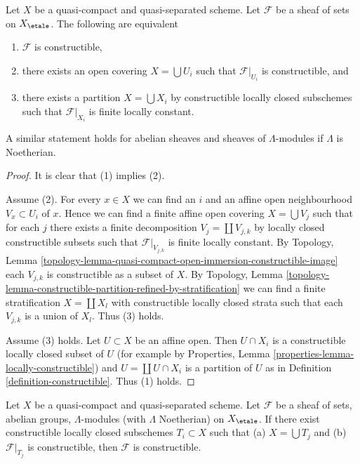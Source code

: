\begin{lemma}
\label{lemma-constructible-quasi-compact-quasi-separated}
Let $X$ be a quasi-compact and quasi-separated scheme. Let $\mathcal{F}$
be a sheaf of sets on $X_\etale$. The following are equivalent
\begin{enumerate}
\item $\mathcal{F}$ is constructible,
\item there exists an open covering $X = \bigcup U_i$ such that
$\mathcal{F}|_{U_i}$ is constructible, and
\item there exists a partition $X = \bigcup X_i$ by constructible
locally closed subschemes such that $\mathcal{F}|_{X_i}$ is finite
locally constant.
\end{enumerate}
A similar statement holds for abelian sheaves and sheaves of
$\Lambda$-modules if $\Lambda$ is Noetherian.
\end{lemma}

\begin{proof}
It is clear that (1) implies (2).

\medskip\noindent
Assume (2). For every $x \in X$ we can find an $i$ and an affine open
neighbourhood $V_x \subset U_i$ of $x$. Hence we can find a finite
affine open covering $X = \bigcup V_j$ such that for each $j$ there
exists a finite decomposition $V_j = \coprod V_{j, k}$ by locally closed
constructible subsets such that $\mathcal{F}|_{V_{j, k}}$ is finite
locally constant. By Topology, Lemma
\ref{topology-lemma-quasi-compact-open-immersion-constructible-image}
each $V_{j, k}$ is constructible as a subset of $X$.
By Topology, Lemma
\ref{topology-lemma-constructible-partition-refined-by-stratification}
we can find a finite stratification $X = \coprod X_l$ with constructible
locally closed strata such that each
$V_{j, k}$ is a union of $X_l$. Thus (3) holds.

\medskip\noindent
Assume (3) holds. Let $U \subset X$ be an affine open.
Then $U \cap X_i$ is a constructible locally closed subset of $U$
(for example by Properties, Lemma \ref{properties-lemma-locally-constructible})
and $U = \coprod U \cap X_i$ is a partition of $U$ as in
Definition \ref{definition-constructible}. Thus (1) holds.
\end{proof}

\begin{lemma}
\label{lemma-constructible-constructible}
Let $X$ be a quasi-compact and quasi-separated scheme.
Let $\mathcal{F}$ be a sheaf of sets, abelian groups,
$\Lambda$-modules (with $\Lambda$ Noetherian) on $X_\etale$.
If there exist constructible locally closed subschemes $T_i \subset X$
such that (a) $X = \bigcup T_j$ and (b) $\mathcal{F}|_{T_j}$ is
constructible, then $\mathcal{F}$ is constructible.
\end{lemma}

